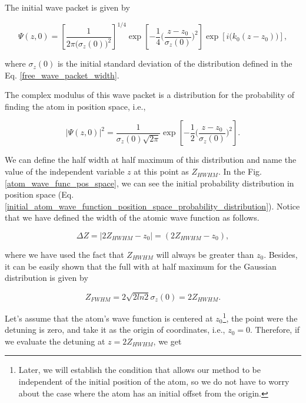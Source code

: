 \documentclass{article}
\begin{document}
The initial wave packet is given by

\begin{equation}\label{initial_atom_wave_function_position_space}
    \Psi (z, 0) = \left[\frac{1}{2 \pi \big(\sigma_{z}(0)\big)^2} \right]^{1/4} \exp \left[-\frac{1}{4}\bigg(\frac{z-z_{0}}{\sigma_{z}(0)}\bigg)^{2} \right] \exp \left[i \bigg(k_{0}(z-z_{0})\bigg) \right],
\end{equation}

where $\sigma_{z}(0)$ is the initial standard deviation of the distribution defined in the Eq. \ref{free_wave_packet_width}.

The complex modulus of this wave packet is a distribution for the probability of finding the atom in position space, i.e.,

\begin{equation}\label{initial_atom_wave_function_position_space_probability_distribution}
    |\Psi (z, 0)|^{2} = \frac{1}{\sigma_{z}(0) \sqrt{2 \pi}} \exp \left[-\frac{1}{2}\bigg(\frac{z-z_{0}}{\sigma_{z}(0)}\bigg)^{2} \right].
\end{equation}

We can define the half width at half maximum of this distribution and name the value of the independent variable $z$ at this point as $Z_{HWHM}$. In the Fig. \ref{atom_wave_func_pos_space}, we can see the initial probability distribution in position space (Eq. \ref{initial_atom_wave_function_position_space_probability_distribution}). Notice that we have defined the width of the atomic wave function as follows.

\begin{equation}\label{width_atomic_wave_function}
  \Delta Z = |2Z_{HWHM} - z_{0}| = (2Z_{HWHM} - z_{0}),
\end{equation}

where we have used the fact that $Z_{HWHM}$ will always be greater than $z_{0}$. Besides, it can be easily shown that the full with at half maximum for the Gaussian distribution is given by

\begin{equation}\label{FWHM_normal_distribution}
Z_{FWHM} = 2\sqrt{2ln2} \sigma_{z}(0) = 2 Z_{HWHM}.
\end{equation}

Let's assume that the atom's wave function is centered at $z_{0}$\footnote{Later, we will establish the condition that allows our method to be independent of the initial position of the atom, so we do not have to worry about the case where the atom has an initial offset from the origin.}, the point were the detuning is zero, and take it as the origin of coordinates, i.e., $z_{0}=0$. Therefore, if we evaluate the detuning at $z = 2Z_{HWHM}$, we get
\end{document}
